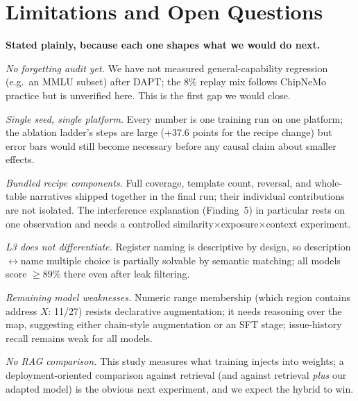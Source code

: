 \section{Limitations and Open Questions}
\label{sec:limitations}

\textbf{Stated plainly, because each one shapes what we would do next.}

\emph{No forgetting audit yet.} We have not measured general-capability
regression (e.g.\ an MMLU subset) after DAPT; the 8\% replay mix follows
ChipNeMo practice but is unverified here. This is the first gap we would
close.

\emph{Single seed, single platform.} Every number is one training run on one
platform; the ablation ladder's steps are large (+37.6 points for the recipe
change) but error bars would still become necessary before any causal claim
about smaller effects.

\emph{Bundled recipe components.} Full coverage, template count, reversal, and
whole-table narratives shipped together in the final run; their individual
contributions are not isolated. The interference explanation
(Finding~5) in particular rests on one observation and needs a controlled
similarity$\times$exposure$\times$context experiment.

\emph{L3 does not differentiate.} Register naming is descriptive by design, so
description$\leftrightarrow$name multiple choice is partially solvable by
semantic matching; all models score $\ge$89\% there even after leak
filtering.

\emph{Remaining model weaknesses.} Numeric range membership (which region
contains address $X$: 11/27) resists declarative augmentation; it needs
reasoning over the map, suggesting either chain-style augmentation or an SFT
stage; issue-history recall remains weak for all models.

\emph{No RAG comparison.} This study measures what training injects into
weights; a deployment-oriented comparison against retrieval (and against
retrieval \emph{plus} our adapted model) is the obvious next experiment, and
we expect the hybrid to win.
